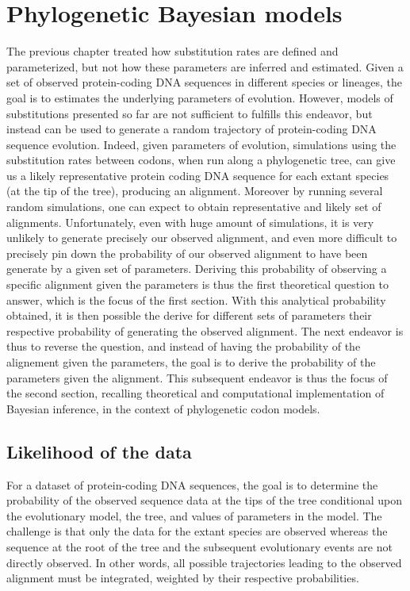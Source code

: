 \chapter{Phylogenetic Bayesian models}
{
	\hypersetup{linkcolor=GREYDARK}
	\minitoc
}
\label{sec:phylo_bayes}
The previous chapter treated how substitution rates are defined and parameterized, but not how these parameters are inferred and estimated.
Given a set of observed protein-coding DNA sequences in different species or lineages, the goal is to estimates the underlying parameters of evolution.
However, models of substitutions presented so far are not sufficient to fulfills this endeavor, but instead can be used to generate a random trajectory of protein-coding DNA sequence evolution.
Indeed, given parameters of evolution, simulations using the substitution rates between codons, when run along a phylogenetic tree, can give us a likely representative protein coding DNA sequence for each extant species (at the tip of the tree), producing an alignment. 
Moreover by running several random simulations, one can expect to obtain representative and likely set of alignments.
Unfortunately, even with huge amount of simulations, it is very unlikely to generate precisely our observed alignment, and even more difficult to precisely pin down the probability of our observed alignment to have been generate by a given set of parameters.
Deriving this probability of observing a specific alignment given the parameters is thus the first theoretical question to answer, which is the focus of the first section.
With this analytical probability obtained, it is then possible the derive for different sets of parameters their respective probability of generating the observed alignment.
The next endeavor is thus to reverse the question, and instead of having the probability of the alignement given the parameters, the goal is to derive the probability of the parameters given the alignment.
This subsequent endeavor is thus the focus of the second section, recalling theoretical and computational implementation of Bayesian inference, in the context of phylogenetic codon models.

\section{Likelihood of the data}

For a dataset of protein-coding \acrshort{DNA} sequences, the goal is to determine the probability of the observed sequence data at the tips of the tree conditional upon the evolutionary model, the tree, and values of parameters in the model.
The challenge is that only the data for the extant species are observed whereas the sequence at the root of the tree and the subsequent evolutionary events are not directly observed.
In other words, all possible trajectories leading to the observed alignment must be integrated, weighted by their respective probabilities.


